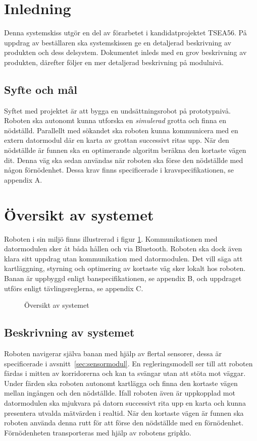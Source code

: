 \documentclass[11pt]{article}
\begin{document}
\begin{flushleft}

\section{Inledning}
Denna systemskiss utgör en del av förarbetet i kandidatprojektet TSEA56. På uppdrag av beställaren ska systemskissen ge en detaljerad beskrivning av produkten och dess delsystem. Dokumentet inleds med en grov beskrivning av produkten, därefter följer en mer detaljerad beskrivning på modulnivå.
\subsection{Syfte och mål}
Syftet med projektet är att bygga en undsättningsrobot på prototypnivå. Roboten ska autonomt kunna utforska en \textit{simulerad} grotta och finna en nödställd. Parallellt med sökandet ska roboten kunna kommunicera med en extern datormodul där en karta av grottan successivt ritas upp. När den nödställde är funnen ska en optimerande algoritm beräkna den kortaste vägen dit. Denna väg ska sedan användas när roboten ska förse den nödställde med någon förnödenhet. Dessa krav finns specificerade i kravspecifikationen, se appendix A.

\pagebreak
\section{Översikt av systemet}
Roboten i sin miljö finns illustrerad i figur \ref{system}. Kommunikationen med datormodulen sker åt båda hållen och via Bluetooth\textsuperscript{\circledR}. Roboten ska dock även klara sitt uppdrag utan kommunikation med datormodulen. Det vill säga att kartläggning, styrning och optimering av kortaste väg sker lokalt hos roboten. Banan är uppbyggd enligt banspecifikationen, se appendix B, och uppdraget utförs enligt tävlingsreglerna, se appendix C.
\begin{figure}[htbp]
\centering
\noindent\resizebox{.8\linewidth}{!}{
	}
	\caption{Översikt av systemet \label{system}}	
\end{figure}


\subsection{Beskrivning av systemet}
Roboten navigerar själva banan med hjälp av flertal sensorer, dessa är specificerade i \mbox{avsnitt \ref{sec:sensormodul}}. En regleringsmodell ser till att roboten färdas i mitten av korridorerna och kan ta svängar utan att stöta mot väggar. Under färden ska roboten autonomt kartlägga och finna den kortaste vägen mellan ingången och den nödställde. Ifall roboten även är uppkopplad mot datormodulen ska mjukvara på datorn successivt rita upp en karta och kunna presentera utvalda mätvärden i realtid. När den kortaste vägen är funnen ska roboten använda denna rutt för att förse den nödställde med en förnödenhet. Förnödenheten transporteras med hjälp av robotens gripklo.


\end{flushleft}
\end{document}
